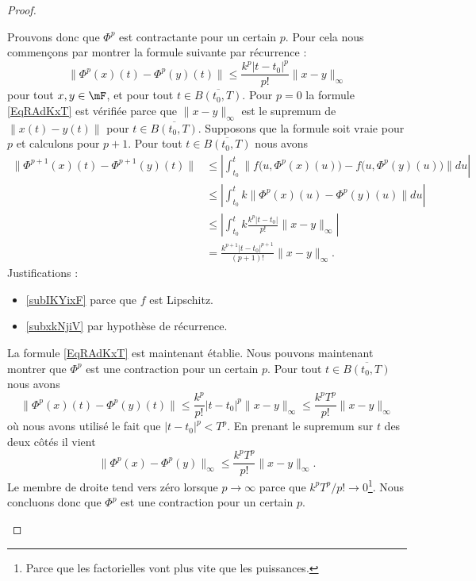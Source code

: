 \begin{proof}
\begin{subproof}
		Prouvons donc que \( \Phi^p\) est contractante pour un certain \( p\). Pour cela nous commençons par montrer la formule suivante par récurrence :
		\begin{equation}        \label{EqRAdKxT}
			\big\| \Phi^p(x)(t)-\Phi^p(y)(t) \big\|\leq \frac{ k^p| t-t_0 |^p }{ p! }\| x-y \|_{\infty}
		\end{equation}
		pour tout \( x,y\in\mF\), et pour tout \( t\in\overline{ B(t_0,T) }\). Pour \( p=0\) la formule \eqref{EqRAdKxT} est vérifiée parce que \( \| x-y \|_{\infty}\) est le supremum de \( \| x(t)-y(t) \|\) pour \( t\in\overline{ B(t_0,T) }\). Supposons que la formule soit vraie pour \( p\) et calculons pour \( p+1\). Pour tout \( t\in\overline{ B(t_0,T) }\) nous avons
		\begin{subequations}
			\begin{align}
				\big\| \Phi^{p+1}(x)(t)-\Phi^{p+1}(y)(t) \big\| & \leq \left| \int_{t_0}^t\big\| f\big( u,\Phi^p(x)(u) \big)-f\big( u,\Phi^p(y)(u) \big) \big\|du \right|                     \\
				                                                & \leq \left| \int_{t_0}^tk\| \Phi^p(x)(u)-\Phi^p(y)(u) \|du \right|                  \label{subIKYixF}                       \\
				                                                & \leq \left| \int_{t_0}^tk\frac{ k^p| t-t_0 | }{ p! }\| x-y \|_{\infty} \right|                          & \label{subxkNjiV} \\
				                                                & = \frac{ k^{p+1}| t-t_0 |^{p+1} }{ (p+1)! }\| x-y \|_{\infty}.
			\end{align}
		\end{subequations}
		Justifications :
		\begin{itemize}
			\item \eqref{subIKYixF} parce que \( f\) est Lipschitz.
			\item \eqref{subxkNjiV} par hypothèse de récurrence.
		\end{itemize}
		La formule \eqref{EqRAdKxT} est maintenant établie. Nous pouvons maintenant montrer que \( \Phi^p\) est une contraction pour un certain \( p\). Pour tout \( t\in \overline{ B(t_0,T) }\) nous avons
		\begin{equation}
			\| \Phi^p(x)(t)-\Phi^p(y)(t) \|\leq \frac{ k^p }{ p! }| t-t_0 |^p\| x-y \|_{\infty}     \leq \frac{ k^pT^p }{ p! }\| x-y \|_{\infty}
		\end{equation}
		où nous avons utilisé le fait que \( | t-t_0 |^p<T^p\). En prenant le supremum sur \( t\) des deux côtés il vient
		\begin{equation}
			\| \Phi^p(x)-\Phi^p(y) \|_{\infty}\leq\frac{ k^pT^p }{ p! }\| x-y \|_{\infty}.
		\end{equation}
		Le membre de droite tend vers zéro lorsque \( p\to\infty\) parce que \( k^pT^p/p!\to 0\)\footnote{Parce que les factorielles vont plus vite que les puissances.}. Nous concluons donc que \( \Phi^p\) est une contraction pour un certain \( p\).


\end{subproof}
\end{proof}
